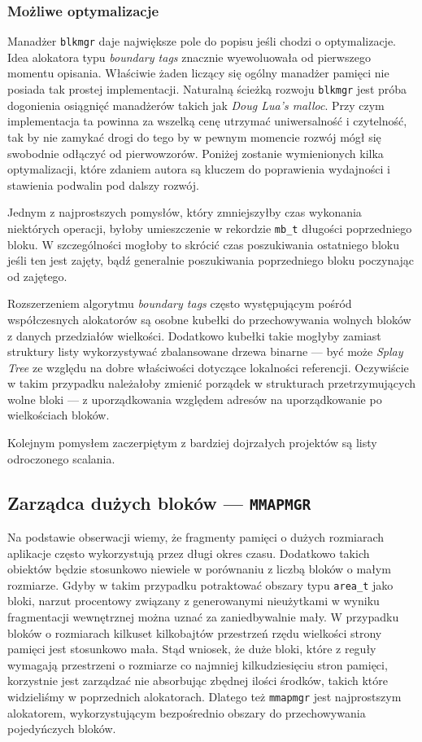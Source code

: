 \documentclass[12pt,a4paper,titlepage,twoside]{mwart}
\begin{document}
\subsubsection{Możliwe optymalizacje}

Manadżer \texttt{blkmgr} daje największe pole do popisu jeśli chodzi o
optymalizacje. Idea alokatora typu \textit{boundary tags} znacznie wyewoluowała
od pierwszego momentu opisania. Właściwie żaden liczący się ogólny manadżer
pamięci nie posiada tak prostej implementacji. Naturalną ścieżką rozwoju
\texttt{blkmgr} jest próba dogonienia osiągnięć manadżerów takich jak
\textit{Doug Lua's malloc}. Przy czym implementacja ta powinna za wszelką cenę
utrzymać uniwersalność i czytelność, tak by nie zamykać drogi do tego by w
pewnym momencie rozwój mógł się swobodnie odłączyć od pierwowzorów. Poniżej
zostanie wymienionych kilka optymalizacji, które zdaniem autora są kluczem do
poprawienia wydajności i stawienia podwalin pod dalszy rozwój.

Jednym z najprostszych pomysłów, który zmniejszyłby czas wykonania niektórych
operacji, byłoby umieszczenie w rekordzie \verb+mb_t+ długości poprzedniego
bloku. W szczególności mogłoby to skrócić czas poszukiwania ostatniego bloku
jeśli ten jest zajęty, bądź generalnie poszukiwania poprzedniego bloku
poczynając od zajętego.

Rozszerzeniem algorytmu \textit{boundary tags} często występującym pośród
współczesnych alokatorów są osobne kubełki do przechowywania wolnych bloków z
danych przedziałów wielkości. Dodatkowo kubełki takie mogłyby zamiast struktury
listy wykorzystywać zbalansowane drzewa binarne --- być może \textit{Splay
Tree} ze względu na dobre właściwości dotyczące lokalności referencji.
Oczywiście w takim przypadku należałoby zmienić porządek w strukturach
przetrzymujących wolne bloki --- z uporządkowania względem adresów na
uporządkowanie po wielkościach bloków.

Kolejnym pomysłem zaczerpiętym z bardziej dojrzałych projektów są listy
odroczonego scalania. 

\newpage

\subsection{Zarządca dużych bloków --- \texttt{MMAPMGR}}

Na podstawie obserwacji wiemy, że fragmenty pamięci o dużych rozmiarach
aplikacje często wykorzystują przez długi okres czasu. Dodatkowo takich
obiektów będzie stosunkowo niewiele w porównaniu z liczbą bloków o małym
rozmiarze. Gdyby w takim przypadku potraktować obszary typu \verb+area_t+ jako
bloki, narzut procentowy związany z generowanymi nieużytkami w wyniku
fragmentacji wewnętrznej można uznać za zaniedbywalnie mały. W przypadku bloków
o rozmiarach kilkuset kilkobajtów przestrzeń rzędu wielkości strony pamięci
jest stosunkowo mała. Stąd wniosek, że duże bloki, które z reguły wymagają
przestrzeni o rozmiarze co najmniej kilkudziesięciu stron pamięci, korzystnie
jest zarządzać nie absorbując zbędnej ilości środków, takich które widzieliśmy
w poprzednich alokatorach. Dlatego też \verb+mmapmgr+ jest najprostszym
alokatorem, wykorzystującym bezpośrednio obszary do przechowywania pojedyńczych
bloków.
\end{document}
